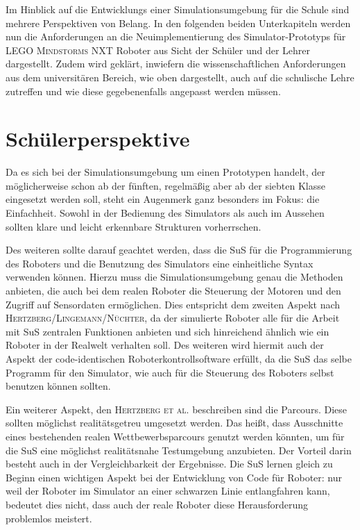 \documentclass[paper=a4, pagesize, DIV=calc, BCOR=15mm, twoside=on, onecolumn=on, open = right, titlepage =on, parskip =half-, headsepline = on, footsepline = on, chapterprefix = on, appendixprefix = off, fontsize = 12pt, numbers = noenddot, abstract = on]{scrbook}
\numberwithin{equation}{chapter}
\theoremstyle{definition}
\theoremstyle{plain}
\theoremstyle{plain}
\theoremstyle{remark}
\theoremstyle{plain}
\theoremstyle{plain}
\begin{document}
Im Hinblick auf die Entwicklungs einer Simulationsumgebung für die Schule sind mehrere Perspektiven von Belang. 
In den folgenden beiden Unterkapiteln werden nun die Anforderungen an die Neuimplementierung des Simulator-Prototyps für \textsc{LEGO Mindstorms} NXT Roboter aus Sicht der Schüler und der Lehrer dargestellt. Zudem wird geklärt, inwiefern die wissenschaftlichen Anforderungen aus dem universitären Bereich, wie oben dargestellt, auch auf die schulische Lehre zutreffen und wie diese gegebenenfalls angepasst werden müssen.

\par \singlespacing
\section{Schülerperspektive}
\label{sec:schüler}
\onehalfspacing

Da es sich bei der Simulationsumgebung um einen Prototypen handelt, der möglicherweise schon ab der fünften, regelmäßig aber ab der siebten Klasse eingesetzt werden soll, steht ein Augenmerk ganz besonders im Fokus: die Einfachheit. Sowohl in der Bedienung des Simulators als auch im Aussehen sollten klare und leicht erkennbare Strukturen vorherrschen.

Des weiteren sollte darauf geachtet werden, dass die SuS für die Programmierung des Roboters und die Benutzung des Simulators eine einheitliche Syntax verwenden können. Hierzu muss die Simulationsumgebung genau die Methoden anbieten, die auch bei dem realen Roboter die Steuerung der Motoren und den Zugriff auf Sensordaten ermöglichen. Dies entspricht dem zweiten Aspekt nach \textsc{Hertzberg/Lingemann/Nüchter}, da der simulierte Roboter alle für die Arbeit mit SuS zentralen Funktionen anbieten und sich hinreichend ähnlich wie ein Roboter in der Realwelt verhalten soll. Des weiteren wird hiermit auch der Aspekt der code-identischen Roboterkontrollsoftware erfüllt, da die SuS das selbe Programm für den Simulator, wie auch für die Steuerung des Roboters selbst benutzen können sollten.

Ein weiterer Aspekt, den \textsc{Hertzberg et al.} beschreiben sind die Parcours. Diese sollten möglichst realitätsgetreu umgesetzt werden. Das heißt, dass Ausschnitte eines bestehenden realen Wettbewerbsparcours genutzt werden könnten, um für die SuS eine möglichst realitätsnahe Testumgebung anzubieten. Der Vorteil darin besteht auch in der Vergleichbarkeit der Ergebnisse. Die SuS lernen gleich zu Beginn einen wichtigen Aspekt bei der Entwicklung von Code für Roboter: nur weil der Roboter im Simulator an einer schwarzen Linie entlangfahren kann, bedeutet dies nicht, dass auch der reale Roboter diese Herausforderung problemlos meistert.
\end{document}
